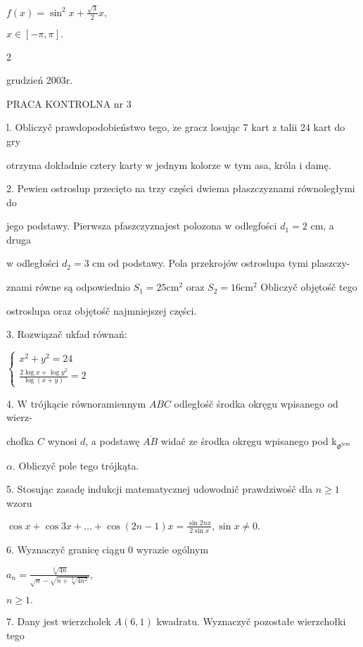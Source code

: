\documentclass[a4paper,12pt]{article}
\begin{document}
$f(x)=\displaystyle \sin^{2}x+\frac{\sqrt{3}}{2}x,$

$x\in[-\pi,\pi].$

2





grudzień 2003r.

PRACA KONTROLNA nr 3

l. Obliczyč prawdopodobieństwo tego, $\dot{\mathrm{z}}\mathrm{e}$ gracz losując 7 kart $\mathrm{z}$ talii 24 kart do gry

otrzyma dokładnie cztery karty $\mathrm{w}$ jednym kolorze $\mathrm{w}$ tym asa, króla $\mathrm{i}$ damę.

2. Pewien ostroslup przecięto na trzy części dwiema płaszczyznami równoległymi do

jego podstawy. Pierwsza pfaszczyznajest polozona $\mathrm{w}$ odlegfości $d_{1}=2$ cm, a druga

$\mathrm{w}$ odległości $d_{2}=3$ cm od podstawy. Pola przekrojów ostroslupa tymi plaszczy-

znami równe są odpowiednio $S_{1}=25\mathrm{c}\mathrm{m}^{2}$ oraz $S_{2}=16\mathrm{c}\mathrm{m}^{2}$ Obliczyč objętośč tego

ostroslupa oraz objętośč najmniejszej części.

3. Rozwiązač ukfad równań:

$\left\{\begin{array}{l}
x^{2}+y^{2}=24\\
\frac{2\log x+\log y^{2}}{\log(x+y)}=2
\end{array}\right.$

4. $\mathrm{W}$ trójkącie równoramiennym $ABC$ odległośč środka okręgu wpisanego od wierz-

chofka $C$ wynosi $d$, a podstawę $\overline{AB}$ widač ze środka okręgu wpisanego pod $\mathrm{k}_{\Phi^{\mathrm{t}\mathrm{e}\mathrm{m}}}$

$\alpha$. Obliczyč pole tego trójkąta.

5. Stosując zasadę indukcji matematycznej udowodnič prawdziwośč dla $n\geq 1$ wzoru

$\displaystyle \cos x+\cos 3x+\ldots+\cos(2n-1)x=\frac{\sin 2nx}{2\sin x},\sin x\neq 0.$

6. Wyznaczyč granicę ciągu 0 wyrazie ogólnym

$a_{n}=\displaystyle \frac{\sqrt[6]{4n}}{\sqrt{n}-\sqrt{n+\sqrt[3]{4n^{2}}}},$

$n\geq 1.$

7. Dany jest wierzcholek $A(6,1)$ kwadratu. Wyznaczyč pozostałe wierzchołki tego
\end{document}
